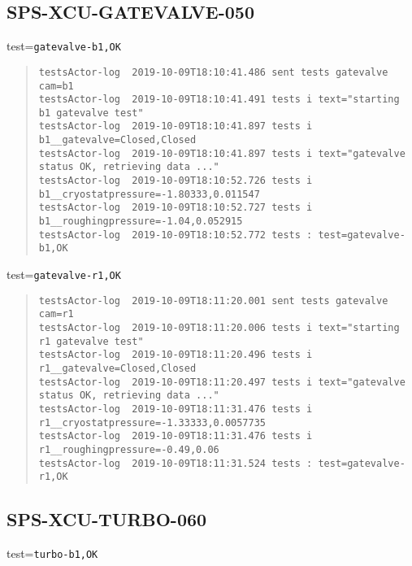 \subsection{SPS-XCU-GATEVALVE-050}
\label{sec:tc-050}

test=\texttt{gatevalve-b1,OK}

\begin{quote}
\begin{tiny}
\begin{verbatim}
testsActor-log  2019-10-09T18:10:41.486 sent tests gatevalve cam=b1
testsActor-log  2019-10-09T18:10:41.491 tests i text="starting b1 gatevalve test"
testsActor-log  2019-10-09T18:10:41.897 tests i b1__gatevalve=Closed,Closed
testsActor-log  2019-10-09T18:10:41.897 tests i text="gatevalve status OK, retrieving data ..."
testsActor-log  2019-10-09T18:10:52.726 tests i b1__cryostatpressure=-1.80333,0.011547
testsActor-log  2019-10-09T18:10:52.727 tests i b1__roughingpressure=-1.04,0.052915
testsActor-log  2019-10-09T18:10:52.772 tests : test=gatevalve-b1,OK
\end{verbatim}
\end{tiny}
\end{quote}

\noindent test=\texttt{gatevalve-r1,OK}

\begin{quote}
\begin{tiny}
\begin{verbatim}
testsActor-log  2019-10-09T18:11:20.001 sent tests gatevalve cam=r1
testsActor-log  2019-10-09T18:11:20.006 tests i text="starting r1 gatevalve test"
testsActor-log  2019-10-09T18:11:20.496 tests i r1__gatevalve=Closed,Closed
testsActor-log  2019-10-09T18:11:20.497 tests i text="gatevalve status OK, retrieving data ..."
testsActor-log  2019-10-09T18:11:31.476 tests i r1__cryostatpressure=-1.33333,0.0057735
testsActor-log  2019-10-09T18:11:31.476 tests i r1__roughingpressure=-0.49,0.06
testsActor-log  2019-10-09T18:11:31.524 tests : test=gatevalve-r1,OK
\end{verbatim}
\end{tiny}
\end{quote}


\subsection{SPS-XCU-TURBO-060}
\label{sec:tc-060}

test=\texttt{turbo-b1,OK}

